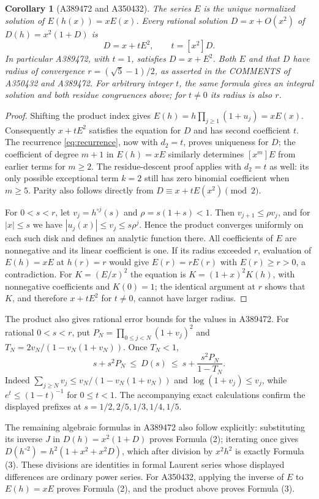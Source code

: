 \documentclass[11pt]{article}
\newtheorem{corollary}[theorem]{Corollary}
\begin{document}
\begin{corollary}[A389472 and A350432]\label{cor:product}
The series $E$ is the unique normalized solution of $E(h(x))=xE(x)$.
Every rational solution $D=x+O(x^2)$ of
$D(h)=x^2(1+D)$ is
\[
 D=x+tE^2,\qquad t=[x^2]D.
\]
In particular A389472, with $t=1$, satisfies $D=x+E^2$.
Both $E$ and that $D$ have radius of convergence
$r=(\sqrt5-1)/2$, as asserted in the COMMENTS of A350432 and A389472.
For arbitrary integer $t$, the same formula gives an integral solution
and both residue congruences above; for $t\ne0$ its radius is also $r$.
\end{corollary}
\begin{proof}
Shifting the product index gives
$E(h)=h\prod_{j\geq1}(1+u_j)=xE(x)$.
Consequently $x+tE^2$ satisfies the equation for $D$ and has second
coefficient $t$. The recurrence \eqref{eq:recurrence}, now with
$d_2=t$, proves uniqueness for $D$; the coefficient of degree $m+1$
in $E(h)=xE$ similarly determines $[x^m]E$ from earlier terms for
$m\geq2$. The residue-descent proof applies with $d_2=t$ as well:
its only possible exceptional term $k=2$ still has zero binomial
coefficient when $m\geq5$. Parity also follows directly from
$D\equiv x+tE(x^2)\pmod2$.

For $0<s<r$, let $v_j=h^{\circ j}(s)$ and
$\rho=s(1+s)<1$. Then $v_{j+1}\leq\rho v_j$, and for $|x|\leq s$
we have $|u_j(x)|\leq v_j\leq s\rho^j$. Hence the product converges
uniformly on each such disk and defines an analytic function there.
All coefficients of $E$ are nonnegative and its linear coefficient is one.
If its radius exceeded $r$, evaluation of $E(h)=xE$ at $h(r)=r$
would give $E(r)=rE(r)$ with $E(r)\geq r>0$, a contradiction.
For $K=(E/x)^2$ the equation is $K=(1+x)^2K(h)$, with nonnegative
coefficients and $K(0)=1$; the identical argument at $r$ shows that
$K$, and therefore $x+tE^2$ for $t\ne0$, cannot have larger radius.
\end{proof}

The product also gives rational error bounds for the values in A389472.
For rational $0<s<r$, put
$P_N=\prod_{0\leq j<N}(1+v_j)^2$ and
$T_N=2v_N/(1-v_N(1+v_N))$. Once $T_N<1$,
\[
 s+s^2P_N\ \leq\ D(s)\ \leq\ s+\frac{s^2P_N}{1-T_N}.
\]
Indeed $\sum_{j\geq N}v_j\leq v_N/(1-v_N(1+v_N))$ and
$\log(1+v_j)\leq v_j$, while $e^t\leq(1-t)^{-1}$ for $0\leq t<1$.
The accompanying exact calculations confirm the displayed prefixes at
$s=1/2,2/5,1/3,1/4,1/5$.

The remaining algebraic formulas in A389472 also follow explicitly:
substituting its inverse $J$ in $D(h)=x^2(1+D)$ proves Formula (2);
iterating once gives
$D(h^{\circ2})=h^2(1+x^2+x^2D)$, which after division by $x^2h^2$
is exactly Formula (3). These divisions are identities in formal Laurent
series whose displayed differences are ordinary power series.
For A350432, applying the inverse of $E$ to $E(h)=xE$ proves
Formula (2), and the product above proves Formula (3).
\end{document}
